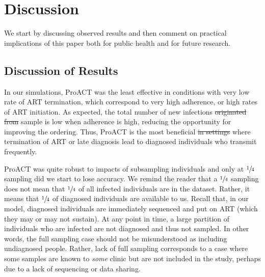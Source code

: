 \documentclass[a4paper,11pt]{article}
\newcommand{\PLWH}{sample\xspace}
\providecommand{\DIFadd}[1]{{\protect\color{blue}\uwave{#1}}} %
\providecommand{\DIFdel}[1]{{\protect\color{red}\sout{#1}}}                      %
\providecommand{\DIFaddbegin}{} %
\providecommand{\DIFaddend}{} %
\providecommand{\DIFdelbegin}{} %
\providecommand{\DIFdelend}{} %
\begin{document}
\section{Discussion}


We start by discussing observed results and then comment on practical implications of this paper both for public health and for future research. 


\subsection{Discussion of Results}

In our simulations, ProACT was the least effective in conditions with very low rate of ART termination, which correspond to very high adherence, or high rates of ART initiation.
As expected, the total number of new infections \DIFdelbegin \DIFdel{originated from }%
\DIFdelend \DIFaddbegin \DIFadd{per  }\PLWH \DIFaddend is low when adherence is high,  reducing the opportunity for improving the ordering.
Thus, ProACT is the most beneficial  \DIFdelbegin \DIFdel{in settings }\DIFdelend where termination of ART or late diagnosis lead to diagnosed individuals who transmit frequently. 

ProACT was quite robust to impacts of subsampling individuals and only at $\sfrac{1}{4}$ sampling did we start to lose accuracy.
We remind the reader that a $\sfrac{1}{4}$ sampling does not mean that $\sfrac{1}{4}$ of all infected individuals are in the dataset. 
Rather, it means that $\sfrac{1}{4}$ of diagnosed individuals  are available to us. Recall that, in our model, diagnosed individuals are immediately  sequenced and put on ART (which they may or may not sustain). 
At any point in time, a large partition of individuals who are infected are not diagnosed and thus not sampled. 
In other words, the full sampling case should not be misunderstood as including undiagnosed people.
 Rather, lack of full sampling corresponds to a case where some \PLWH{s} are known to {\em some} clinic but are not included in the study, perhaps due to a lack of sequencing or data sharing. 
\end{document}
